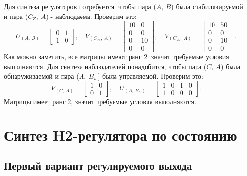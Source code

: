 Для синтеза регуляторов потребуется, чтобы пара ($A,\ B$) была стабилизируемой и 
пара ($C_Z,\ A$) - наблюдаема. Проверим это:
\begin{equation*}
    U_{(A,\ B)}=\begin{bmatrix}
        0	&1\\
        1	&0
    \end{bmatrix},\quad
    V_{(C_{Z1},\ A)}=\begin{bmatrix}
        10	&0\\
        0&	0\\
        0	&10\\
        0	&0
    \end{bmatrix},\quad
    V_{(C_{Z2},\ A)}=\begin{bmatrix}
        10	&50\\
        0&	0\\
        0	&10\\
        0	&0
    \end{bmatrix}.
\end{equation*}
Как можно заметить, все матрицы имеют ранг 2, значит требуемые условия выполняются.
Для синтеза наблюдателей понадобится, чтобы пара ($C,\ A$) была
обнаруживаемой и пара ($A,\ B_w$) была управляемой. Проверим это:
\begin{equation*}
    V_{(C,\ A)}=\begin{bmatrix}
        1	&0\\
        0&	1
    \end{bmatrix},\quad
    U_{(A,\ B_w)}=\begin{bmatrix}
        1	&0&	1	&0\\
        1&0&	0	&0
    \end{bmatrix}.
\end{equation*}
Матрицы имеет ранг 2, значит требуемые условия выполняются.





\section{Синтез H2-регулятора по состоянию}

\subsection{Первый вариант регулируемого выхода}
\label{sec:regout1}

